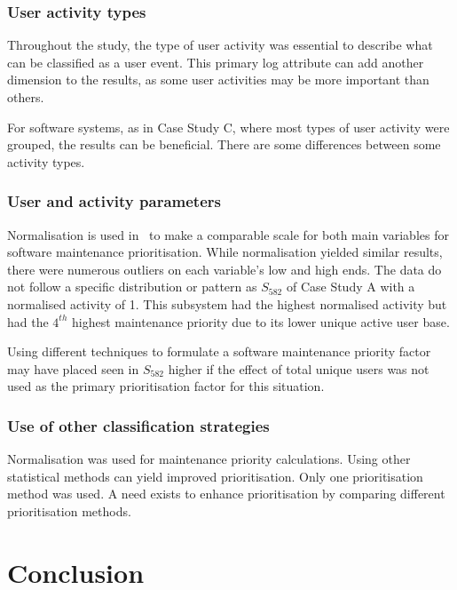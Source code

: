 \subsubsection{User activity types}
Throughout the study, the type of user activity was essential to describe what can be classified as a user event. This primary log attribute can add another dimension to the results, as some user activities may be more important than others. \par For software systems, as in Case Study C, where most types of user activity were grouped, the results can be beneficial. There are some differences between some activity types. 

\subsubsection{User and activity parameters}
\par Normalisation is used in~ to make a comparable scale for both main variables for software maintenance prioritisation. While normalisation yielded similar results, there were numerous outliers on each variable's low and high ends. The data do not follow a specific distribution or pattern as $S_{582}$ of Case Study A with a normalised activity of 1. This subsystem had the highest normalised activity but had the $4^{th}$ highest maintenance priority due to its lower unique active user base. \par Using different techniques to formulate a software maintenance priority factor may have placed seen in $S_{582}$ higher if the effect of total unique users was not used as the primary prioritisation factor for this situation. 

\subsubsection{Use of other classification strategies}
Normalisation was used for maintenance priority calculations. Using other statistical methods can yield improved prioritisation. Only one prioritisation method was used. A need exists to enhance prioritisation by comparing different prioritisation methods.

\section{Conclusion}

